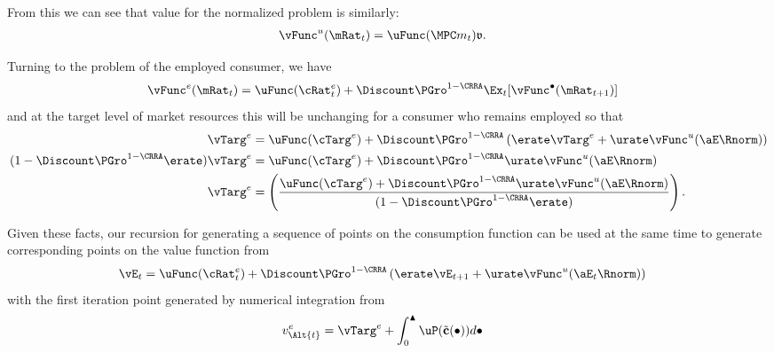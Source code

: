 \documentclass{\handout}
\begin{document}
From this we can see that value for the normalized problem is similarly:
\begin{equation}\begin{gathered}\begin{aligned}
  \vFunc^{u}(\mRat_{t}) & =  \uFunc(\MPCU m_{t}) \mathfrak{v}
.
\end{aligned}\end{gathered}\end{equation}

Turning to the problem of the employed consumer, we have
\begin{equation}\begin{gathered}\begin{aligned}
  \vFunc^{e}(\mRat_{t}) & =  \uFunc({\cRat}^{e}_{t})+\Discount \PGro^{1-\CRRA} \Ex_{t}[\vFunc^{\bullet}(\mRat_{t+1})]
\end{aligned}\end{gathered}\end{equation}
and at the target level of market resources this will be unchanging for a consumer who
remains employed so that 
\begin{equation}\begin{gathered}\begin{aligned}
  \vTarg^{e} & =  \uFunc(\cTarg^{e})+\Discount \PGro^{1-\CRRA} \left(\erate \vTarg^{e} + \urate \vFunc^{u}(\aE \Rnorm)\right)
\\ (1-\Discount \PGro^{1-\CRRA} \erate) \vTarg^{e} & =  \uFunc(\cTarg^{e})+\Discount \PGro^{1-\CRRA} \urate \vFunc^{u}(\aE \Rnorm)
\\ \vTarg^{e} & =  \left(\frac{\uFunc(\cTarg^{e})+\Discount \PGro^{1-\CRRA} \urate \vFunc^{u}(\aE \Rnorm)}{(1-\Discount \PGro^{1-\CRRA} \erate) }\right)
.
\end{aligned}\end{gathered}\end{equation}

Given these facts, our recursion for generating a sequence of points on the consumption
function can be used at the same time to generate corresponding points on the value function from
\begin{equation}\begin{gathered}\begin{aligned}
  \vE_{t} & =  \uFunc({\cRat}^{e}_{t})+\Discount \PGro^{1-\CRRA} \left(\erate \vE_{t+1} + \urate \vFunc^{u}(\aE_{t} \Rnorm)\right)
\end{aligned}\end{gathered}\end{equation}
with the first iteration point generated by numerical integration from 
\begin{equation}\begin{gathered}\begin{aligned}
  v^{e}_{\Alt{t}} & =  \vTarg^{e}+\int_{0}^{\blacktriangle} \uP(\tilde{\mathbf{c}}(\bullet)) d\bullet
\end{aligned}\end{gathered}\end{equation}
\end{document}
